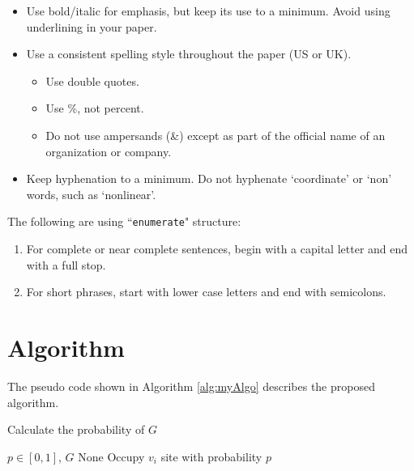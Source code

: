 \begin{itemize} 
    
    \item  Use bold/italic for emphasis, but keep its use to a minimum. Avoid using underlining in your paper.
    \item  Use a consistent spelling style throughout the paper (US or UK).
    \begin{itemize}  %
        \item  Use double quotes.
        \item  Use \%, not percent.
        \item  Do not use ampersands (\&) except as part of the official name of an organization or company.
    \end{itemize}
    \item  Keep hyphenation to a minimum. Do not hyphenate `coordinate' or `non' words, such as `nonlinear'.
    
\end{itemize}

The following are using ``\texttt{enumerate}" structure:

\begin{enumerate} 
    
    \item  For complete or near complete sentences, begin with a capital letter and end with a full stop.
    \item  For short phrases, start with lower case letters and end with semicolons.
    
\end{enumerate}

    
\section{Algorithm}
    
    The pseudo code shown in Algorithm \ref{alg:myAlgo} describes the proposed algorithm.
    
    \begin{algorithm}
        \small{
            \caption{Calculate the probability of $G$}\label{alg:myAlgo}
            \begin{algorithmic} [1]
                \Require $p \in [0,1]$, $G$
                \Ensure None
                  
                \State Occupy $v_i$ site with probability $p$ 
                \EndIf
                \EndIf
                \EndFor
            \end{algorithmic}}
        \end{algorithm}
        
